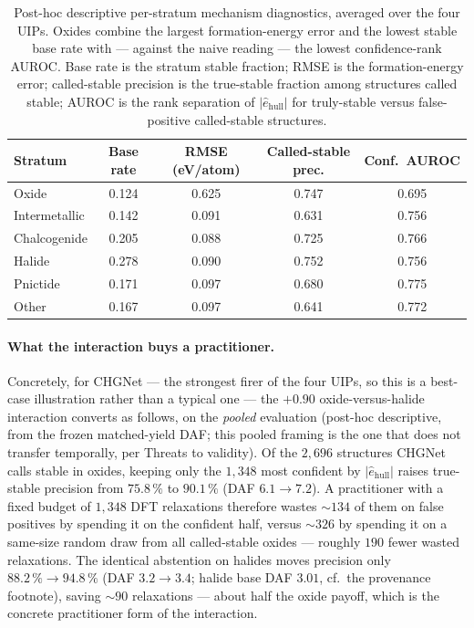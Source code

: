 \documentclass[aip,jcp,preprint,superscriptaddress,amsmath,amssymb]{revtex4-2}
\begin{document}
\begin{table}[t]
  \centering
  \caption{Post-hoc descriptive per-stratum mechanism diagnostics, averaged over the four UIPs.
  Oxides combine the largest formation-energy error and the lowest stable base rate with ---
  against the naive reading --- the lowest confidence-rank AUROC. Base rate is the
  stratum stable fraction; RMSE is the formation-energy error; called-stable precision is the
  true-stable fraction among structures called stable; AUROC is the rank separation of
  $|\hat{e}_{\mathrm{hull}}|$ for truly-stable versus false-positive called-stable structures.}
  \label{tab:mechanism}
  \begin{tabular}{lcccc}
    \toprule
    Stratum & Base rate & RMSE (eV/atom) & Called-stable prec. & Conf.\ AUROC \\
    \midrule
    Oxide          & 0.124 & 0.625 & 0.747 & 0.695 \\
    Intermetallic  & 0.142 & 0.091 & 0.631 & 0.756 \\
    Chalcogenide   & 0.205 & 0.088 & 0.725 & 0.766 \\
    Halide         & 0.278 & 0.090 & 0.752 & 0.756 \\
    Pnictide       & 0.171 & 0.097 & 0.680 & 0.775 \\
    Other          & 0.167 & 0.097 & 0.641 & 0.772 \\
    \bottomrule
  \end{tabular}
\end{table}

\paragraph{What the interaction buys a practitioner.} Concretely, for CHGNet --- the strongest
firer of the four UIPs, so this is a best-case illustration rather than a typical one --- the
$+0.90$ oxide-versus-halide interaction converts as follows, on the \emph{pooled} evaluation
(post-hoc descriptive, from the frozen matched-yield DAF; this pooled framing is the one that
does not transfer temporally, per Threats to validity). Of the $2{,}696$ structures CHGNet
calls stable in oxides, keeping only the
$1{,}348$ most confident by $|\hat{e}_{\mathrm{hull}}|$ raises true-stable precision from
$75.8\,\%$ to $90.1\,\%$ (DAF $6.1 \to 7.2$). A practitioner with a fixed budget of $1{,}348$
DFT relaxations therefore wastes $\sim\!134$ of them on false positives by spending it on the
confident half, versus $\sim\!326$ by spending it on a same-size random draw from all
called-stable oxides --- roughly $190$ fewer wasted relaxations. The identical abstention on
halides moves precision only $88.2\,\% \to 94.8\,\%$ (DAF $3.2 \to 3.4$; halide base DAF $3.01$,
cf.\ the provenance footnote), saving $\sim\!90$ relaxations --- about half the oxide payoff,
which is the concrete practitioner form of the interaction.
\end{document}
